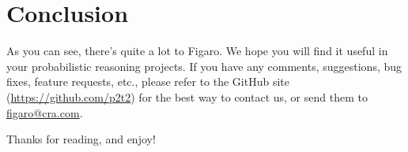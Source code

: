 
\chapter{Conclusion} %

\label{Conclusion} %


As you can see, there's quite a lot to Figaro. We hope you will find it useful in your probabilistic reasoning projects. If you have any comments, suggestions, bug fixes, feature requests, etc., please refer to the GitHub site (\url{https://github.com/p2t2}) for the best way to contact us, or send them to \href{mailto:figaro@cra.com}{figaro@cra.com}.

Thanks for reading, and enjoy!